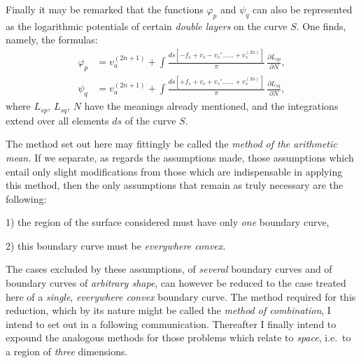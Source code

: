 \documentclass{article}
\begin{document}
Finally it may be remarked that the functions $\varphi_{p}$ and $\psi_{q}$ can also be represented as the logarithmic potentials of certain \emph{double layers} on the curve $S$. One finds, namely, the formulas:
\[
\begin{aligned}
\varphi_{p} &= v_{a}^{(2n+1)}+\int \frac{ds\left[-f_{s}+v_{s}-v_{s}'\ldots\ldots+v_{s}^{(2n)}\right]}{\pi}\,\frac{\partial L_{sp}}{\partial N},\\
\psi_{q} &= v_{a}^{(2n+1)}+\int \frac{ds\left[+f_{s}+v_{s}+v_{s}'\ldots\ldots+v_{s}^{(2n)}\right]}{\pi}\,\frac{\partial L_{sq}}{\partial N},
\end{aligned}
\]
where $L_{sp}$, $L_{sq}$, $N$ have the meanings already mentioned, and the integrations extend over all elements $ds$ of the curve $S$.

The method set out here may fittingly be called the \emph{method of the arithmetic mean.} If we separate, as regards the assumptions made, those assumptions which entail only slight modifications from those which are indispensable in applying this method, then the only assumptions that remain as truly necessary are the following:

1) the region of the surface considered must have only \emph{one} boundary curve,

2) this boundary curve must be \emph{everywhere convex.}

The cases excluded by these assumptions, of \emph{several} boundary curves and of boundary curves of \emph{arbitrary shape}, can however be reduced to the case treated here of a \emph{single}, \emph{everywhere convex} boundary curve. The method required for this reduction, which by its nature might be called the \emph{method of combination}, I intend to set out in a following communication. Thereafter I finally intend to expound the analogous methods for those problems which relate to \emph{space}, i.e.\ to a region of \emph{three} dimensions.
\end{document}
